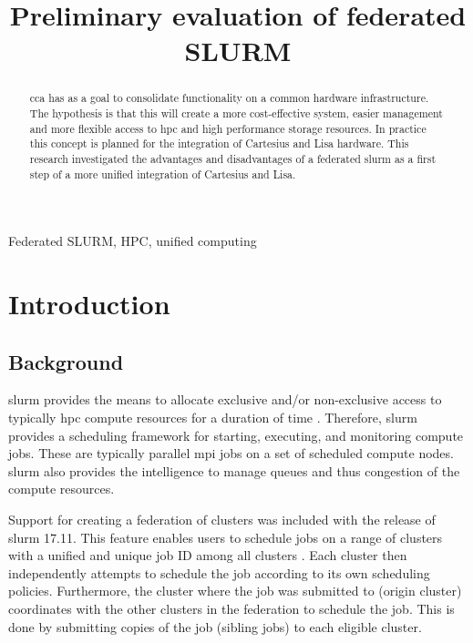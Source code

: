 \documentclass[conference]{IEEEtran}
\begin{document}
\title{Preliminary evaluation of federated SLURM}

\author{
}

\maketitle

\begin{abstract}
\gls{cca} has as a goal to consolidate functionality on a common hardware infrastructure. The hypothesis is that this will create a more cost-effective system, easier management and more flexible access to \gls{hpc} and high performance storage resources. In practice this concept is planned for the integration of Cartesius \cite{cartesius-userinfo} and Lisa \cite{lisa-userinfo} hardware. This research investigated the advantages and disadvantages of a federated \gls{slurm} as a first step of a more unified integration of Cartesius and Lisa.
\end{abstract}

\begin{IEEEkeywords}
Federated SLURM, HPC, unified computing
\end{IEEEkeywords}


\section{Introduction}
\subsection{Background}
\label{sec-background}
\gls{slurm} provides the means to allocate exclusive and/or non-exclusive access to typically \gls{hpc} compute resources for a duration of time \cite{wiki-slurm}. Therefore, \gls{slurm} provides a scheduling framework for starting, executing, and monitoring compute jobs. These are typically parallel \gls{mpi} jobs on a set of scheduled compute nodes. \gls{slurm} also provides the intelligence to manage queues and thus congestion of the compute resources.

Support for creating a federation of clusters was included with the release of \gls{slurm} 17.11. This feature enables users to schedule jobs on a range of clusters with a unified and unique job ID among all clusters \cite{slurm-federated-guide}. Each cluster then independently attempts to schedule the job according to its own scheduling policies. Furthermore, the cluster where the job was submitted to (origin cluster) coordinates with the other clusters in the federation to schedule the job. This is done by submitting copies of the job (sibling jobs) to each eligible cluster.
\end{document}
